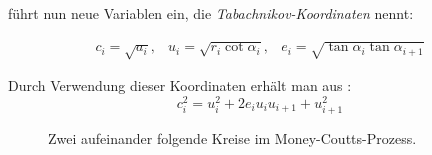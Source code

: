 \citet{Taba2000} führt nun neue Variablen ein, die \citet{Troub2000} \emph{Tabachnikov-Koordinaten} nennt:

\begin{equation}
    \begin{array}{ccc}
        c_i = \sqrt{a_i}, & u_i = \sqrt{r_i \cot\alpha_i}, & e_i = \sqrt{\tan\alpha_i \tan\alpha_{i+1}}
    \end{array}
    \label{mcp:taba-coordinates}
\end{equation}

Durch Verwendung dieser Koordinaten erhält man aus :
\begin{equation}
    c_i^2 = u_i^2 + 2 e_i u_i u_{i+1} + u_{i+1}^2
\end{equation}

\begin{figure}[htbp]
    
    \caption{Zwei aufeinander folgende Kreise im Money-Coutts-Prozess.}
    \label{fig:mcp:two-circles}
\end{figure}


